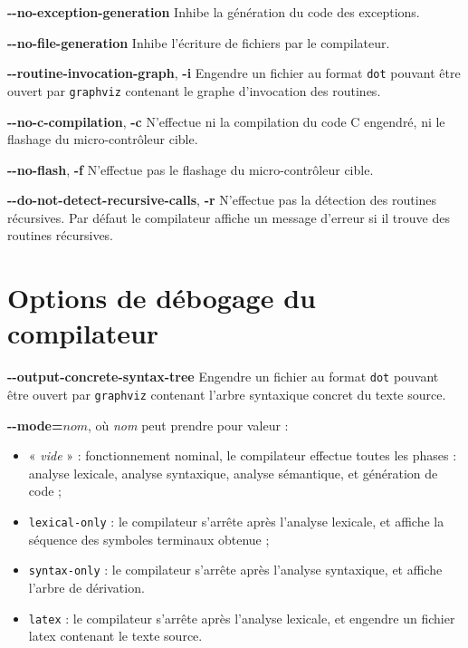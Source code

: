 
{\ttfamily\bfseries-{}-no-exception-generation} Inhibe la génération du code des exceptions.



{\ttfamily\bfseries-{}-no-file-generation} Inhibe l'écriture de fichiers par le compilateur.


{\ttfamily\bfseries-{}-routine-invocation-graph}, {\ttfamily\bfseries-i} Engendre un fichier au format \texttt{dot} pouvant être ouvert par \texttt{graphviz} contenant le graphe d'invocation des routines.

{\ttfamily\bfseries-{}-no-c-compilation}, {\ttfamily\bfseries-c} N'effectue ni la compilation du code C engendré, ni le flashage du micro-contrôleur cible.


{\ttfamily\bfseries-{}-no-flash}, {\ttfamily\bfseries-f} N'effectue pas le flashage du micro-contrôleur cible.


{\ttfamily\bfseries-{}-do-not-detect-recursive-calls}, {\ttfamily\bfseries-r} N'effectue pas la détection des routines récursives. Par défaut le compilateur affiche un message d'erreur si il trouve des routines récursives.






\section{Options de débogage du compilateur}


{\ttfamily\bfseries-{}-output-concrete-syntax-tree} Engendre un fichier au format \texttt{dot} pouvant être ouvert par \texttt{graphviz} contenant l'arbre syntaxique concret du texte source.


{\ttfamily\bfseries-{}-mode=$nom$}, où \emph{nom} peut prendre pour valeur :
\begin{itemize}
  \item « \emph{vide} » : fonctionnement nominal, le compilateur effectue toutes les phases : analyse lexicale, analyse syntaxique, analyse sémantique, et génération de code ;
  \item \texttt{lexical-only} : le compilateur s'arrête après l'analyse lexicale, et affiche la séquence des symboles terminaux obtenue ;
  \item \texttt{syntax-only} : le compilateur s'arrête après l'analyse syntaxique, et affiche l'arbre de dérivation.
  \item \texttt{latex} : le compilateur s'arrête après l'analyse lexicale, et engendre un fichier latex contenant le texte source.
\end{itemize}

